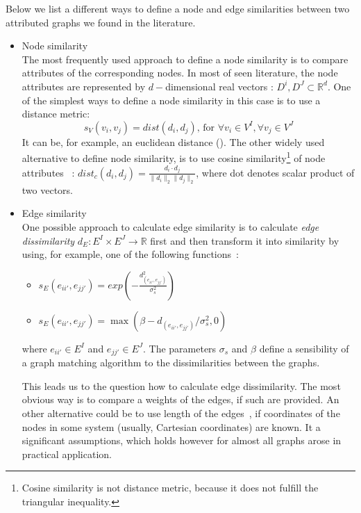Below we list a different ways to define a node and edge similarities between two attributed graphs we found in the literature.
\vspace{-5pt}
\begin{itemize}
	\item Node similarity\\
	The most frequently used approach to define a node similarity is to compare attributes of the corresponding nodes. In most of seen literature, the node attributes are represented by $d-$dimensional real vectors	: $D^i,D^J\subset\mathbb{R}^d$. One of the simplest ways to define a node similarity in this case is to use a distance metric:
	\begin{equation}
	s_V(v_i,v_j) = dist(d_i,d_j)\text{, for }\forall v_i\in V^I,\forall v_j\in V^J
	\end{equation}
	It can be, for example, an euclidean distance %
	(\cite{Cho2010_RRWM}).
	The other widely used alternative to define node similarity, is to use cosine similarity\footnote{Cosine similarity is not distance metric, because it does not fulfill the triangular inequality.} of node attributes ~\cite{CliqueGraph_CVPR2015}: $dist_c(d_i,d_j)=\frac{d_i\cdot d_j}{\|d_i\|_2\|d_j\|_2}$, where dot denotes scalar product of two vectors.
	\vspace{-5pt}
	\item Edge similarity\\
	One possible approach to calculate edge similarity is to calculate \emph{edge dissimilarity} $d_E:E^I\times E^J\rightarrow\mathbb{R}$ first and then transform it into similarity by using, for example, one of the following functions~\cite{Cho2014_Haystack, Cho2009_AgglClustering, Cho2010_RRWM,Cho2012_ProgressiveGM}:
	\begin{itemize}
		\item $s_E(e_{ii\prime}, e_{jj\prime})= exp(-\frac{d_(e_{ii\prime}, e_{jj\prime})^2}{\sigma^2_{s}})$
		\item $s_E(e_{ii\prime}, e_{jj\prime})= \max(\beta - d_(e_{ii\prime}, e_{jj\prime})/\sigma^2_{s},0)$
	\end{itemize}
	where $e_{ii\prime}\in E^I$ and $e_{jj\prime}\in E^J$. The parameters $\sigma_s$ and $\beta$ define a sensibility of a graph matching algorithm to the dissimilarities between the graphs.
	
	This leads us to the question how to calculate edge dissimilarity. The most obvious way is to compare a weights of the edges, if such are provided. An other alternative could be to use length of the edges~\cite{Cho2014_Haystack, Cho2009_AgglClustering, Cho2010_RRWM,Cho2012_ProgressiveGM}, if coordinates of the nodes in some system (usually, Cartesian coordinates) are known. It a significant assumptions, which holds however for almost all graphs arose in practical application.
	

\end{itemize}
